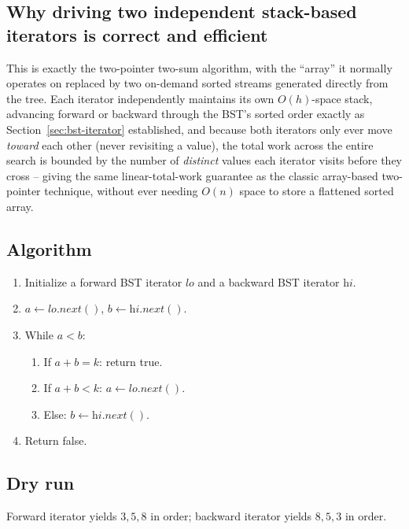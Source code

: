 \subsection*{Why driving two independent stack-based iterators is correct and efficient}

This is exactly the two-pointer two-sum algorithm, with the ``array'' it
normally operates on replaced by two on-demand sorted streams generated
directly from the tree. Each iterator independently maintains its own
$O(h)$-space stack, advancing forward or backward through the BST's
sorted order exactly as Section~\ref{sec:bst-iterator} established, and
because both iterators only ever move \emph{toward} each other (never
revisiting a value), the total work across the entire search is bounded
by the number of \emph{distinct} values each iterator visits before they
cross -- giving the same linear-total-work guarantee as the classic
array-based two-pointer technique, without ever needing $O(n)$ space to
store a flattened sorted array.

\subsection*{Algorithm}

\begin{enumerate}
  \item Initialize a forward BST iterator $\textit{lo}$ and a backward
        BST iterator $\textit{hi}$.
  \item $a \gets \textit{lo}.\textit{next}()$, $b \gets
        \textit{hi}.\textit{next}()$.
  \item While $a < b$:
  \begin{enumerate}
    \item If $a+b=k$: return true.
    \item If $a+b<k$: $a \gets \textit{lo}.\textit{next}()$.
    \item Else: $b \gets \textit{hi}.\textit{next}()$.
  \end{enumerate}
  \item Return false.
\end{enumerate}

\subsection*{Dry run}


Forward iterator yields $3,5,8$ in order; backward iterator yields
$8,5,3$ in order.

